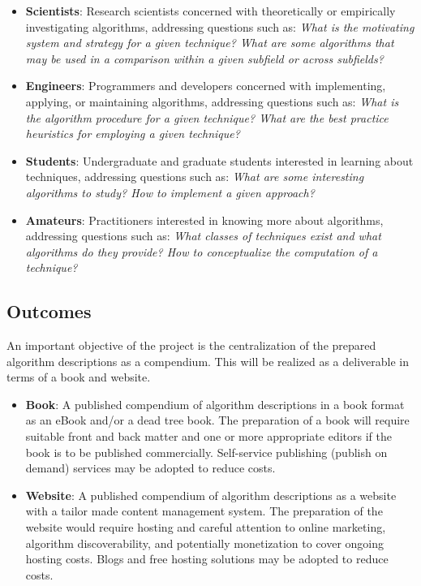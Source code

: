 \documentclass[a4paper, 11pt]{article}
\begin{document}
\begin{itemize}
	\item \textbf{Scientists}: Research scientists concerned with theoretically or empirically investigating algorithms, addressing questions such as: \emph{What is the motivating system and strategy for a given technique? What are some algorithms that may be used in a comparison within a given subfield or across subfields?}
	\item \textbf{Engineers}: Programmers and developers concerned with implementing, applying, or maintaining algorithms, addressing questions such as: \emph{What is the algorithm procedure for a given technique? What are the best practice heuristics for employing a given technique?}
	\item \textbf{Students}: Undergraduate and graduate students interested in learning about techniques, addressing questions such as: \emph{What are some interesting algorithms to study? How to implement a given approach?}
	\item \textbf{Amateurs}: Practitioners interested in knowing more about algorithms, addressing questions such as: \emph{What classes of techniques exist and what algorithms do they provide? How to conceptualize the computation of a technique?}
\end{itemize}

\subsection{Outcomes}
An important objective of the project is the centralization of the prepared algorithm descriptions as a compendium. This will be realized as a deliverable in terms of a book and website.

\begin{itemize}
	\item \textbf{Book}: A published compendium of algorithm descriptions in a book format as an eBook and/or a dead tree book. The preparation of a book will require suitable front and back matter and one or more appropriate editors if the book is to be published commercially. Self-service publishing (publish on demand) services may be adopted to reduce costs.
	\item \textbf{Website}: A published compendium of algorithm descriptions as a website with a tailor made content management system. The preparation of the website would require hosting and careful attention to online marketing, algorithm discoverability, and potentially monetization to cover ongoing hosting costs. Blogs and free hosting solutions may be adopted to reduce costs.
\end{itemize} 
\end{document}
